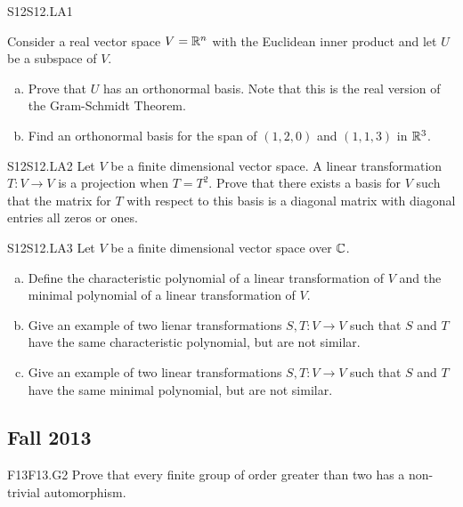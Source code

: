 \documentclass[../AlgebraQualSolutions.tex]{subfiles}
\begin{document}
\begin{prob}{S12}{S12.LA1}

	Consider a real vector space $V = \mathbb{R}^n$ with the Euclidean inner product and let $U$ be a subspace of $V$.

	\begin{enumerate}[(a)]
		\item Prove that $U$ has an orthonormal basis. Note that this is the real version of the Gram-Schmidt Theorem.
		\item Find an orthonormal basis for the span of $(1,2,0)$ and $(1,1,3)$ in $\mathbb{R}^3$.
	\end{enumerate}
\end{prob}

\begin{prob}{S12}{S12.LA2}
	Let $V$ be a finite dimensional vector space. A linear transformation $T: V \to V$ is a projection when $T = T^2$. Prove that there exists a basis for $V$ such that the matrix for $T$ with respect to this basis is a diagonal matrix with diagonal entries all zeros or ones.
\end{prob}

\begin{prob}{S12}{S12.LA3}
	Let $V$ be a finite dimensional vector space over $\mathbb{C}$.

	\begin{enumerate}[(a)]
		\item Define the characteristic polynomial of a linear transformation of $V$ and the minimal polynomial of a linear transformation of $V$.
		\item Give an example of two lienar transformations $S,T: V \to V$ such that $S$ and $T$ have the same characteristic polynomial, but are not similar.
		\item Give an example of two linear transformations $S,T: V \to V$ such that $S$ and $T$ have the same minimal polynomial, but are not similar.
	\end{enumerate}
\end{prob}

\subsection{Fall 2013}

\begin{prob}{F13}{F13.G2}
	Prove that every finite group of order greater than two has a non-trivial automorphism.
\end{prob}
\end{document}
